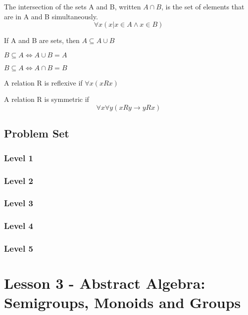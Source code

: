 \documentclass{article}
\begin{document}
\begin{definition}[Intersection]
    The intersection of the sets A and B, written \(A \cap B\), is the set of
    elements that are in A and B simultaneously.
    $$ \forall x(x | x \in A \land x \in B) $$
\end{definition}

\begin{theorem}
    If A and B are sets, then \( A \subseteq A \cup B\)
\end{theorem}

\begin{theorem}
    \(B \subseteq A \iff A \cup B = A\)
\end{theorem}

\begin{theorem}
    \(B \subseteq A \iff A \cap B = B\)
\end{theorem}

\begin{definition}[Reflexive]
    A relation R is reflexive if  $ \forall x(x R x) $
\end{definition}

\begin{definition}[Symmetric]
    A relation R is symmetric if $$\forall x \forall y(x R y \rightarrow y R x)$$
\end{definition}

\subsection{Problem Set}
\subsubsection{Level 1}
\subsubsection{Level 2}
\subsubsection{Level 3}
\subsubsection{Level 4}
\subsubsection{Level 5}
\pagebreak

\section{Lesson 3 - Abstract Algebra: Semigroups, Monoids and Groups}
\end{document}
